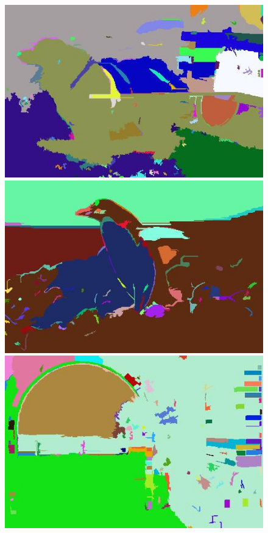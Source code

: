 \begin{figure}[h]
{\begin{minipage}[b]{0.13\linewidth}
\includegraphics[width=1\linewidth]{figures/img/EGB/EGB_247012.jpg}
\includegraphics[width=1\linewidth]{figures/img/EGB/EGB_106005.jpg}
\includegraphics[width=1\linewidth]{figures/img/EGB/EGB_5096.jpg}

\end{minipage}}
\end{figure}
